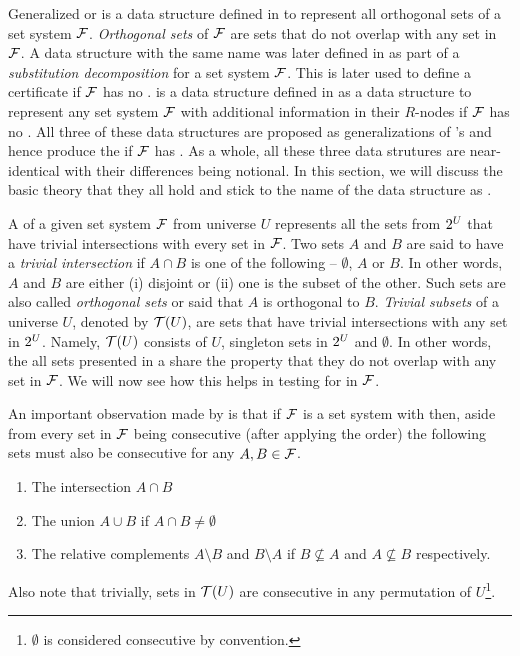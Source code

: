 Generalized \PQtree or \gPQtree is a data structure defined in \cite{n89} to
represent all orthogonal sets of a set system ${\cal F}$. {\em Orthogonal
  sets} of ${\cal F}$ are sets that do not overlap with any set in ${\cal F}$. A
data structure with the same name was later defined in \cite{mcc04} as
part of a {\em substitution decomposition} for a set system
${\cal F}$.  This is later used to define
a certificate if ${\cal F}$ has no \COP. \PQRtree is a data structure
defined in \cite{mm96} as a data structure to represent any set system
${\cal F}$ with additional information in their $R$-nodes if ${\cal F}$ has no
\COP.  All three of these data structures are proposed as
generalizations of \cite{bl76}'s \PQtree and hence produce the
\PQtree if ${\cal F}$ has \COP. As a whole, all these three data
strutures are near-identical with their differences being notional.
In this section, we will discuss the basic theory that they all hold
and stick to the name of the data structure as \PQRtree.

A \PQRtree of a given set system ${\cal F}$ from universe $U$ represents
all the sets from $2^{U}$ that have trivial intersections with
every set in ${\cal F}$.  Two sets $A$ and $B$ are said to have a {\em
  trivial intersection} if $A \cap B$ is one of the following --
$\emptyset$, $A$ or $B$. In other words, $A$ and $B$ are either (i)
disjoint or (ii) one is the subset of the other. Such sets are also
called {\em orthogonal sets} or said that $A$ is orthogonal to
$B$. {\em Trivial subsets} of a universe $U$, denoted by ${\cal T}(U)$, are
sets that have trivial intersections with any set in
$2^{U}$. Namely, ${\cal T}(U)$ consists of $U$, singleton sets in
$2^{U}$ and $\emptyset$\cite{n89, mm96}.  In other words, the all
sets presented in a \PQRtree share the property that they do not
overlap with any set in ${\cal F}$. We will now see how this helps in
testing for \COP in ${\cal F}$.

An important observation made by \cite{mm96} is that if ${\cal F}$ is a set
system with \COP then, aside from every set in ${\cal F}$ being consecutive
(after applying the \COP order) the following sets must also be
consecutive for any $A, B \in {\cal F}$.
\begin{enumerate}
  \item The intersection $A \cap B$ 
  \item The union $A \cup B$ if $A \cap B \ne \emptyset$
  \item The relative complements $A \setminus B$ and $B \setminus A$
    if $B \nsubseteq A$ and $A \nsubseteq B$ respectively.
\end{enumerate}
Also note that trivially, sets in ${\cal T}(U)$ are consecutive in any
permutation of $U$\footnote{$\emptyset$ is considered consecutive by
  convention.}.

